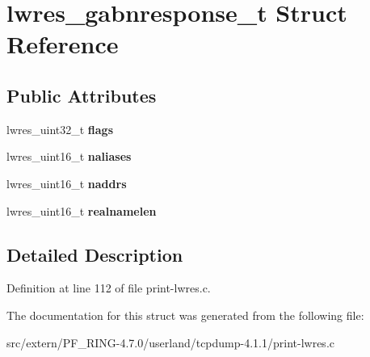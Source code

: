 \hypertarget{structlwres__gabnresponse__t}{
\section{lwres\_\-gabnresponse\_\-t Struct Reference}
\label{structlwres__gabnresponse__t}
}
\subsection*{Public Attributes}
\begin{DoxyCompactItemize}
\item 
\hypertarget{structlwres__gabnresponse__t_aa349ad6f7ea19f8215f39766599d3c76}{
lwres\_\-uint32\_\-t {\bfseries flags}}
\label{structlwres__gabnresponse__t_aa349ad6f7ea19f8215f39766599d3c76}

\item 
\hypertarget{structlwres__gabnresponse__t_a54819ec558dae83a026f0550333ab7dd}{
lwres\_\-uint16\_\-t {\bfseries naliases}}
\label{structlwres__gabnresponse__t_a54819ec558dae83a026f0550333ab7dd}

\item 
\hypertarget{structlwres__gabnresponse__t_a3ada9be05e53a4f3fde6390048d360fa}{
lwres\_\-uint16\_\-t {\bfseries naddrs}}
\label{structlwres__gabnresponse__t_a3ada9be05e53a4f3fde6390048d360fa}

\item 
\hypertarget{structlwres__gabnresponse__t_a4ec3b01550986c437859ab440570188c}{
lwres\_\-uint16\_\-t {\bfseries realnamelen}}
\label{structlwres__gabnresponse__t_a4ec3b01550986c437859ab440570188c}

\end{DoxyCompactItemize}


\subsection{Detailed Description}


Definition at line 112 of file print-\/lwres.c.



The documentation for this struct was generated from the following file:\begin{DoxyCompactItemize}
\item 
src/extern/PF\_\-RING-\/4.7.0/userland/tcpdump-\/4.1.1/print-\/lwres.c\end{DoxyCompactItemize}
